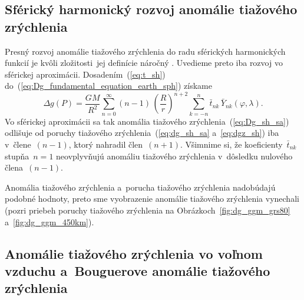 \documentclass[a4paper, 12pt]{book}
\begin{document}
\subsection{Sférický harmonický rozvoj anomálie tiažového zrýchlenia}

Presný rozvoj anomálie tiažového zrýchlenia do radu sférických harmonických 
funkcií je kvôli zložitosti~jej definície náročný \parencite[pozri 
napríklad][]{Barthelmes2013}.  Uvedieme preto iba rozvoj vo sférickej 
aproximácii.  Dosadením~(\ref{eq:t_sh}) 
do~(\ref{eq:Dg_fundamental_equation_earth_sph}) získame
%
\begin{equation}
\label{eq:Dg_sh_sa}
\Delta g(P) = \frac{GM}{R^2} \sum_{n = 0}^\infty (n - 1) \, \left( \frac{R}{r} 
\right)^{n + 2} \sum_{k = -n}^{n} \bar{t}_{nk} \, \bar{Y}_{nk}(\varphi, 
\lambda){.}
\end{equation}
%
Vo sférickej aproximácii sa tak anomália tiažového 
zrýchlenia~(\ref{eq:Dg_sh_sa}) odlišuje od poruchy tiažového 
zrýchlenia~(\ref{eq:dg_sh_sa} a~\ref{eq:dgz_sh}) iba v~člene~$(n - 1)$, ktorý 
nahradil člen~$(n + 1)$.  Všimnime si, že  koeficienty~$\bar{t}_{nk}$ stupňa~$n 
= 1$ neovplyvňujú anomáliu tiažového zrýchlenia v~dôsledku nulového člena~$(n 
- 1)$.

Anomália tiažového zrýchlenia a~porucha tiažového zrýchlenia nadobúdajú podobné 
hodnoty, preto sme vyobrazenie anomálie tiažového zrýchlenia vynechali (pozri 
priebeh poruchy tiažového zrýchlenia na Obrázkoch~\ref{fig:dg_ggm_grs80} 
a~\ref{fig:dg_ggm_450km}).





\subsection{Anomálie tiažového zrýchlenia vo voľnom vzduchu a~Bouguerove 
anomálie tiažového zrýchlenia}
\end{document}
